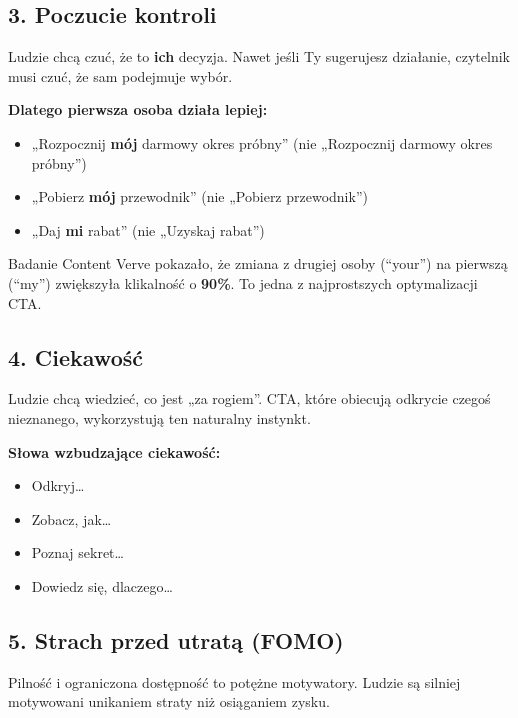\documentclass[
  12pt,
  a4paper,
  twoside,
  openright,
  12pt,
  DIV=12,
  BCOR=12mm]{scrbook}
\providecommand{\tightlist}{%
  \setlength{\itemsep}{0pt}\setlength{\parskip}{0pt}}\usepackage{longtable,booktabs,array}
\begin{document}
\subsection{3. Poczucie kontroli}\label{poczucie-kontroli}

Ludzie chcą czuć, że to \textbf{ich} decyzja. Nawet jeśli Ty sugerujesz
działanie, czytelnik musi czuć, że sam podejmuje wybór.

\textbf{Dlatego pierwsza osoba działa lepiej:}

\begin{itemize}
\tightlist
\item
  „Rozpocznij \textbf{mój} darmowy okres próbny'' (nie „Rozpocznij
  darmowy okres próbny'')
\item
  „Pobierz \textbf{mój} przewodnik'' (nie „Pobierz przewodnik'')
\item
  „Daj \textbf{mi} rabat'' (nie „Uzyskaj rabat'')
\end{itemize}

\begin{wazne}
Badanie Content Verve pokazało, że zmiana z drugiej osoby (``your'') na pierwszą (``my'') zwiększyła klikalność o \textbf{90\%}. To jedna z najprostszych optymalizacji CTA.
\end{wazne}

\subsection{4. Ciekawość}\label{ciekawoux15bux107}

Ludzie chcą wiedzieć, co jest „za rogiem''. CTA, które obiecują odkrycie
czegoś nieznanego, wykorzystują ten naturalny instynkt.

\textbf{Słowa wzbudzające ciekawość:}

\begin{itemize}
\tightlist
\item
  Odkryj\ldots{}
\item
  Zobacz, jak\ldots{}
\item
  Poznaj sekret\ldots{}
\item
  Dowiedz się, dlaczego\ldots{}
\end{itemize}

\subsection{5. Strach przed utratą
(FOMO)}\label{strach-przed-utratux105-fomo}

Pilność i ograniczona dostępność to potężne motywatory. Ludzie są
silniej motywowani unikaniem straty niż osiąganiem zysku.
\end{document}
